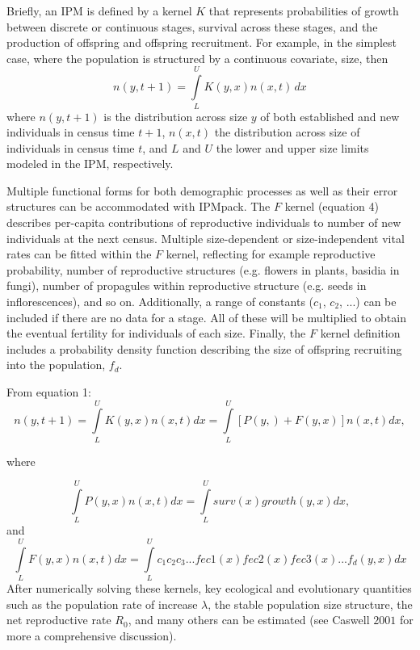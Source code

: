 \documentclass{article}
\begin{document}
Briefly, an IPM is defined by a kernel $K$ that represents probabilities of growth between discrete or continuous stages, survival across these stages, and the production of offspring and offspring recruitment.  For example, in the simplest case, where the population is structured by a continuous covariate, size, then 
\begin{equation}
n(y, t+1) = \int\limits_{L}^{U} K(y, x) n(x, t) \, dx       
\end{equation}
where $n(y, t+1)$ is the distribution across size $y$ of both established and new individuals in census time $t+1$, $n(x, t)$ the distribution across size of individuals in census time $t$, and $L$ and $U$ the lower and upper size limits modeled in the IPM, respectively. 

Multiple functional forms for both demographic processes as well as their error
structures can be  accommodated with IPMpack. The $F$ kernel (equation 4)
describes per-capita contributions of reproductive individuals to number of new
individuals at the next census. Multiple size-dependent or size-independent
vital rates can be fitted within the $F$ kernel, reflecting for example
reproductive probability, number of reproductive structures (e.g. flowers in
plants, basidia in fungi), number of propagules within reproductive structure
(e.g. seeds in inflorescences), and so on. Additionally, a range of constants
($c_1$, $c_2$, ...) can be included if there are no data for a stage. All of these will be multiplied to obtain the eventual fertility for individuals of each size. Finally, the $F$ kernel definition includes a probability density function describing the size of offspring recruiting into the population, $f_d$. 

From equation 1: 
\begin{equation}
n(y, t+1) = \int\limits_{L}^{U} K(y, x) n(x, t) dx = \int\limits_{L}^{U}
[P(y, ) + F(y, x)] n(x, t) dx ,
\end{equation}

where

\begin{equation}
 \int\limits_{L}^{U} P(y, x) n(x, t) dx = \int\limits_{L}^{U}surv(x)growth(y, x)dx ,    
\end{equation}
and
\begin{equation}
 \int\limits_{L}^{U} F(y, x) n(x, t) dx = \int\limits_{L}^{U}
c_1 c_2 c_3 ... fec1(x)fec2(x)fec3(x)...f_d(y, x)dx     
\end{equation}
After numerically solving these kernels, key ecological and evolutionary quantities such as the population rate of increase $\lambda$, the stable population size structure, the net reproductive rate $R_0$, and many others can be estimated (see Caswell $2001$ for more a comprehensive discussion). 
\end{document}
